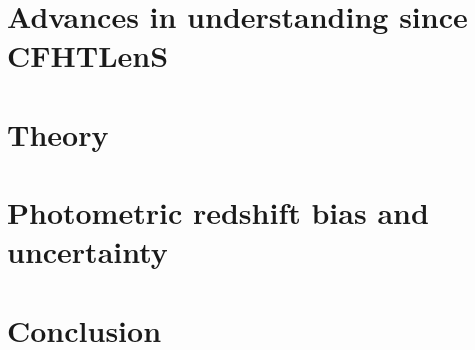 \documentclass[preprint]{aastex}
\begin{document}
\section{Advances in understanding since CFHTLenS}
\label{sec:cfhtlens}


\section{Theory}
\label{sec:theory}


\section{Photometric redshift bias and uncertainty}
\label{sec:photoz}


\section{Conclusion}
\label{sec:conclusion}





\end{document}

